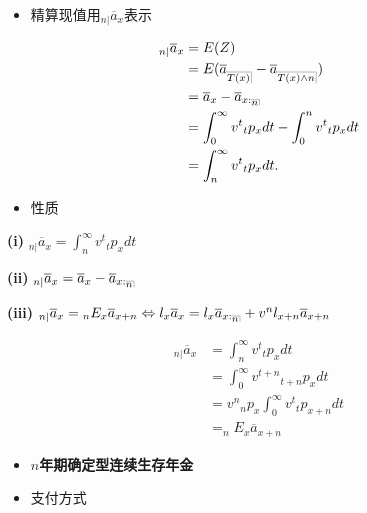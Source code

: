 \documentclass[a4paper,10pt]{ctexbook}
\makeatletter
\newcommand{\hei}{\CJKfamily{hei}}      %
\DeclareRobustCommand{\annu}[1]{_{%
    \def\arraystretch{0}%
    \setlength\arraycolsep{1pt}%
    \setlength\arrayrulewidth{.2pt}%
    \begin{array}[b]{@{}c|}\hline
        \\[\arraycolsep]%
        \scriptstyle #1%
    \end{array}%
}}
\makeatother
\begin{document}
\begin{itemize}
    \item[{\bf\hei3.}] 精算现值用$_{n|}\overline{a}_{x}$表示
\end{itemize}
$$
    \begin{aligned}
        _{n|}\overline{a}_{x} & = E(Z)                                                                 \\
                              & = E(\overline{a}_{\annu {T(x)}} - \overline{a}_{\annu {T(x) \land n}}) \\
                              & = \overline a_{x}-\overline a_{x:\annu n}                              \\
                              & = \int_0^{\infty}v^{t}{}_tp_xdt-\int_0^{n} v^{t}{}_tp_xdt              \\
                              & =\int_n^{\infty}v^{t}{}_tp_xdt.                                        \\
    \end{aligned}
$$

\begin{itemize}
    \item[{\bf\hei 4.}] 性质
\end{itemize}

{\rm\bf(i)} $_{n|}\overline{a}_{x}=\int_n^{\infty}v^{t}{}_tp_xdt$

{\rm\bf(ii)} $_{n|}\overline{a}_{x}=\overline{a}_{x}-\overline{a}_{x:\annu{n}}$

{\rm\bf(iii)} $_{n|}\overline{a}_{x}={}_nE_x\overline{a}_{x+n}\Leftrightarrow l_x\overline{a}_{x}=l_x\overline{a}_{x:\annu{n}}+v^nl_{x+n}
    \overline{a}_{x+n}$

\proof
$$
    \begin{aligned}
        _{n|}\overline{a}_{x} & = \int_n^{\infty}v^{t}{}_tp_xdt                     \\
                              & = \int_0^{\infty}v^{t+n}{}_{t+n}p_xdt               \\
                              & =v^{n}{}_{n}p_x \int_0^{\infty}v^{t}{}_{t}p_{x+n}dt \\
                              & =_nE_x\overline{a}_{x+n}
    \end{aligned}
$$
\begin{itemize}
    \item[{\bf\hei 五.}]{\bf\hei $n$年期确定型连续生存年金}
\end{itemize}

\begin{itemize}
    \item[{\bf\hei 1.}] 支付方式
\end{itemize}
\end{document}
